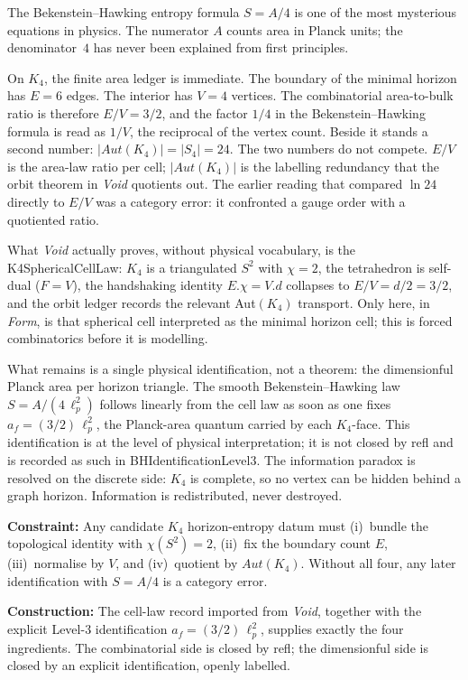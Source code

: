 \documentclass[11pt,a4paper]{book}
\def\cdot{.}%
\def\mathrm#1{#1}%
\def\texttt#1{#1}%
\begin{document}
The Bekenstein--Hawking entropy formula $S = A / 4$ is one of the most
mysterious equations in physics.  The numerator $A$ counts area in Planck
units; the denominator~$4$ has never been explained from first principles.

On $K_4$, the finite area ledger is immediate.  The boundary of the
minimal horizon has $E = 6$ edges.  The interior has $V = 4$ vertices.
The combinatorial area-to-bulk ratio is therefore $E/V = 3/2$, and the
factor $1/4$ in the Bekenstein--Hawking formula is read as $1/V$, the
reciprocal of the vertex count.  Beside it stands a second number:
$|\mathrm{Aut}(K_4)| = |S_4| = 24$.  The two numbers do not compete.
$E/V$ is the area-law ratio per cell; $|\mathrm{Aut}(K_4)|$ is the
labelling redundancy that the orbit theorem in \emph{Void} quotients
out.  The earlier reading that compared $\ln 24$ directly to $E/V$ was
a category error: it confronted a gauge order with a quotiented ratio.

What \emph{Void} actually proves, without physical vocabulary, is the
\texttt{K4SphericalCellLaw}: $K_4$ is a triangulated $S^2$ with
$\chi = 2$, the tetrahedron is self-dual ($F = V$), the handshaking
identity $E \cdot \chi = V \cdot d$ collapses to $E/V = d/2 = 3/2$,
and the orbit ledger records the relevant Aut$(K_4)$ transport.  Only
here, in \emph{Form}, is that spherical cell interpreted as the minimal
horizon cell; this is forced combinatorics before it is modelling.

What remains is a single physical identification, not a theorem:
the dimensionful Planck area per horizon triangle.  The smooth
Bekenstein--Hawking law $S = A / (4\,\ell_p^2)$ follows linearly from
the cell law as soon as one fixes $a_f = (3/2)\,\ell_p^2$, the
Planck-area quantum carried by each $K_4$-face.  This identification
is at the level of physical interpretation; it is not closed by
\texttt{refl} and is recorded as such in
\texttt{BHIdentificationLevel3}.  The information paradox is resolved
on the discrete side: $K_4$ is complete, so no vertex can be hidden
behind a graph horizon.  Information is redistributed, never destroyed.

\textbf{Constraint:}
Any candidate $K_4$ horizon-entropy datum must (i)~bundle the
topological identity with $\chi(S^2) = 2$, (ii)~fix the boundary
count $E$, (iii)~normalise by $V$, and (iv)~quotient by
$\mathrm{Aut}(K_4)$.  Without all four, any later identification with
$S = A / 4$ is a category error.

\textbf{Construction:}
The cell-law record imported from \emph{Void}, together with the
explicit Level-$3$ identification $a_f = (3/2)\,\ell_p^2$, supplies
exactly the four ingredients.  The combinatorial side is closed by
\texttt{refl}; the dimensionful side is closed by an explicit
identification, openly labelled.
\end{document}
